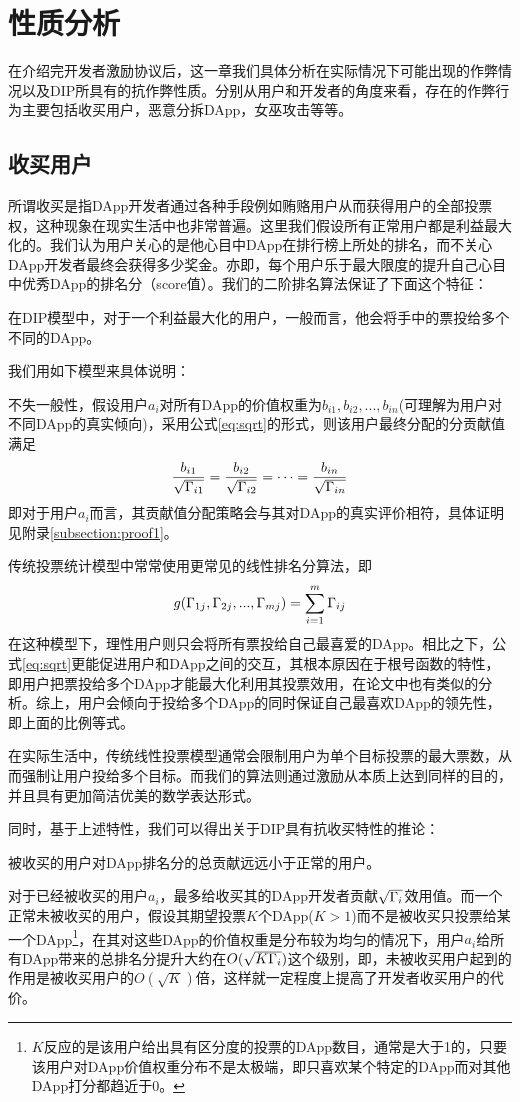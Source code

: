 \section{性质分析}
\label{section:properties}
在介绍完开发者激励协议后，这一章我们具体分析在实际情况下可能出现的作弊情况以及DIP所具有的抗作弊性质。分别从用户和开发者的角度来看，存在的作弊行为主要包括收买用户，恶意分拆DApp，女巫攻击等等。%

\subsection{收买用户}
所谓收买是指DApp开发者通过各种手段例如贿赂用户从而获得用户的全部投票权，这种现象在现实生活中也非常普遍。这里我们假设所有正常用户都是利益最大化的。我们认为用户关心的是他心目中DApp在排行榜上所处的排名，而不关心DApp开发者最终会获得多少奖金。亦即，每个用户乐于最大限度的提升自己心目中优秀DApp的排名分（score值）。我们的二阶排名算法保证了下面这个特征：

\begin{property}
	\label{p1}
	在DIP模型中，对于一个利益最大化的用户，一般而言，他会将手中的票投给多个不同的DApp。
\end{property}
我们用如下模型来具体说明：

不失一般性，假设用户$a_i$对所有DApp的价值权重为$b_{i1},b_{i2},...,b_{in}$(可理解为用户对不同DApp的真实倾向)，采用公式\ref{eq:sqrt}的形式，则该用户最终分配的分贡献值满足
$$\frac{b_{i1}}{\sqrt{\Gamma_{i1}}}=\frac{b_{i2}}{\sqrt{\Gamma_{i2}}}=\cdots=\frac{b_{in}}{\sqrt{\Gamma_{in}}}$$
即对于用户$a_i$而言，其贡献值分配策略会与其对DApp的真实评价相符，具体证明见附录\ref{subsection:proof1}。

传统投票统计模型中常常使用更常见的线性排名分算法，即
$$g(\Gamma_{1j},\Gamma_{2j},...,\Gamma_{mj}) = \sum_{i=1}^m \Gamma_{ij}$$
在这种模型下，理性用户则只会将所有票投给自己最喜爱的DApp。相比之下，公式\ref{eq:sqrt}更能促进用户和DApp之间的交互，其根本原因在于根号函数的特性，即用户把票投给多个DApp才能最大化利用其投票效用，在论文\cite{buterin2018liberal}中也有类似的分析。综上，用户会倾向于投给多个DApp的同时保证自己最喜欢DApp的领先性，即上面的比例等式。

在实际生活中，传统线性投票模型通常会限制用户为单个目标投票的最大票数，从而强制让用户投给多个目标。而我们的算法则通过激励从本质上达到同样的目的，并且具有更加简洁优美的数学表达形式。

同时，基于上述特性，我们可以得出关于DIP具有抗收买特性的推论：
\begin{corollary}
被收买的用户对DApp排名分的总贡献远远小于正常的用户。
\end{corollary}
对于已经被收买的用户$a_i$，最多给收买其的DApp开发者贡献$\sqrt{\Gamma_i}$效用值。而一个正常未被收买的用户，假设其期望投票$K$个DApp($K>1$)而不是被收买只投票给某一个DApp\footnote{$K$反应的是该用户给出具有区分度的投票的DApp数目，通常是大于1的，只要该用户对DApp价值权重分布不是太极端，即只喜欢某个特定的DApp而对其他DApp打分都趋近于0。}，在其对这些DApp的价值权重是分布较为均匀的情况下，用户$a_i$给所有DApp带来的总排名分提升大约在$O(\sqrt{K\Gamma_i})$这个级别，即，未被收买用户起到的作用是被收买用户的$O(\sqrt{K})$倍，这样就一定程度上提高了开发者收买用户的代价。

